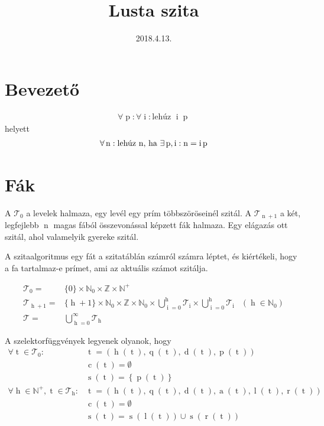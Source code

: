 \documentclass{article}
\title{Lusta szita}
\date{2018.4.13.}
\newcommand*{\Integers}{\ensuremath{\mathbb{Z}}}
\newcommand*{\NaturalsP}{\ensuremath{\mathbb{N}^+}}
\newcommand*{\NaturalsZ}{\ensuremath{\mathbb{N}_0}}
\newcommand*{\Trees}{\ensuremath{\mathcal{T}}}
\newcommand*{\sAccumulated}[1]{\ensuremath{\operatorname{a}\left(#1\right)}}
\newcommand*{\sChildren}[1]{\ensuremath{\operatorname{c}\left(#1\right)}}
\newcommand*{\sDiff}[1]{\ensuremath{\operatorname{d}\left(#1\right)}}
\newcommand*{\sHeight}[1]{\ensuremath{\operatorname{h}\left(#1\right)}}
\newcommand*{\sLeft}[1]{\ensuremath{\operatorname{l}\left(#1\right)}}
\newcommand*{\sPosition}[1]{\ensuremath{\operatorname{q}\left(#1\right)}}
\newcommand*{\sPrime}[1]{\ensuremath{\operatorname{p}\left(#1\right)}}
\newcommand*{\sPrimes}[1]{\ensuremath{\operatorname{s}\left(#1\right)}}
\newcommand*{\sRight}[1]{\ensuremath{\operatorname{r}\left(#1\right)}}
\newcommand*{\vH}{\ensuremath{\operatorname{h}}}
\newcommand*{\vI}{\ensuremath{\operatorname{i}}}
\newcommand*{\vN}{\ensuremath{\operatorname{n}}}
\newcommand*{\vP}{\ensuremath{\operatorname{p}}}
\newcommand*{\vT}{\ensuremath{\operatorname{t}}}
\begin{document}
\small

\maketitle

\tableofcontents

\section{Bevezető}

\begin{align*}
\forall \vP: \forall \vI: \text{lehúz } \vI \vP
\end{align*}
helyett
\begin{align*}
\forall \vN: \text{lehúz \vN, ha } \exists \vP, \vI: \vN=\vI\vP
\end{align*}

\section{Fák}

A $ \Trees_0 $ a levelek halmaza, egy levél egy prím többszöröseinél szitál.
A $ \Trees_{\vN+1} $ a két, legfejlebb $\vN$  magas fából összevonással képzett fák halmaza. Egy elágazás ott szitál, ahol valamelyik gyereke szitál.

A szitaalgoritmus egy fát a szitatáblán számról számra léptet, és kiértékeli,
hogy a fa tartalmaz-e prímet, ami az aktuális számot szitálja.

\begin{align*}
\Trees_0 =&
	\{0\}
	\times \NaturalsZ
	\times \Integers
	\times \NaturalsP \\
\Trees_{\vH+1} =&
	\{\vH+1\}
	\times \NaturalsZ
	\times \Integers
	\times \NaturalsZ
	\times \bigcup_{\vI=0}^{\vH} \Trees_{\vI}
	\times \bigcup_{\vI=0}^{\vH} \Trees_{\vI}
	& (\vH \in \NaturalsZ) \\
\Trees =& \bigcup_{\vH=0}^{\infty} \Trees_{\vH}
\end{align*}

A szelektorfüggvények legyenek olyanok, hogy
\begin{align*}
\forall \vT \in \Trees_0: &\vT = \left(
	\sHeight{\vT},
	\sPosition{\vT},
	\sDiff{\vT},
	\sPrime{\vT}
	\right) \\
&\sChildren{\vT} = \emptyset \\
&\sPrimes{\vT} = \left\lbrace \sPrime{\vT} \right\rbrace \\
\forall \vH \in \NaturalsP, \vT \in \Trees_{\vH}: &\vT = \left(
	\sHeight{\vT},
	\sPosition{\vT},
	\sDiff{\vT},
	\sAccumulated{\vT},
	\sLeft{\vT},
	\sRight{\vT}
	\right) \\
&\sChildren{\vT} = \emptyset \\
&\sPrimes{\vT} = \sPrimes{\sLeft{\vT}} \cup \sPrimes{\sRight{\vT}}
\end{align*}
\end{document}
